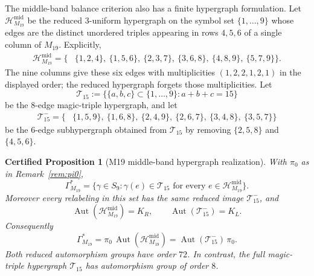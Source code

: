 \documentclass[11pt,a4paper]{article}
\newtheorem{certprop}[theorem]{Certified Proposition}
\theoremstyle{definition}
\theoremstyle{remark}
\providecommand{\Aut}{\operatorname{Aut}}
\newcommand{\GMninetn}{\Gamma^{*}_{M_{19}}}     %
\newcommand{\KL}{K_L}
\newcommand{\KR}{K_R}
\begin{document}
The middle-band balance criterion also has a finite hypergraph
formulation. Let $\mathcal H_{M_{19}}^{\mathrm{mid}}$ be the reduced
$3$-uniform hypergraph on the symbol set $\{1,\dots,9\}$ whose edges
are the distinct unordered triples appearing in rows $4,5,6$ of a
single column of $M_{19}$. Explicitly,
\begin{equation*}
\begin{split}
\mathcal H_{M_{19}}^{\mathrm{mid}}
   = \{&\{1,2,4\},\ \{1,5,6\},\ \{2,3,7\},\
       \{3,6,8\},\ \{4,8,9\},\ \{5,7,9\}\}.
\end{split}
\end{equation*}
The nine columns give these six edges with multiplicities
$(1,2,2,1,2,1)$ in the displayed order; the reduced hypergraph forgets
those multiplicities. Let
\begin{equation*}
   \mathcal T_{15}
      := \bigl\{\{a,b,c\} \subset \{1,\dots,9\} : a+b+c=15\bigr\}
\end{equation*}
be the $8$-edge magic-triple hypergraph, and let
\begin{equation*}
\begin{split}
\mathcal T^-_{15}
   = \{&\{1,5,9\},\ \{1,6,8\},\ \{2,4,9\},\
       \{2,6,7\},\ \{3,4,8\},\ \{3,5,7\}\}
\end{split}
\end{equation*}
be the $6$-edge subhypergraph obtained from $\mathcal T_{15}$ by
removing $\{2,5,8\}$ and $\{4,5,6\}$.

\begin{certprop}[M19 middle-band hypergraph realization]
\label{thm:M19-hypergraph}
With $\pi_0$ as in Remark~\ref{rem:pi0},
\begin{equation}\label{eq:M19-hypergraph-embeddings}
   \GMninetn
   = \bigl\{\gamma\in S_9 :
        \gamma(e) \in \mathcal T_{15}
         \text{ for every } e\in \mathcal H_{M_{19}}^{\mathrm{mid}}
     \bigr\}.
\end{equation}
Moreover every relabeling in this set has the same reduced image
$\mathcal T^-_{15}$, and
\begin{equation}\label{eq:M19-hypergraph-aut}
   \Aut(\mathcal H_{M_{19}}^{\mathrm{mid}}) = \KR,
   \qquad
   \Aut(\mathcal T^-_{15}) = \KL.
\end{equation}
Consequently
\begin{equation}\label{eq:M19-hypergraph-coset}
   \GMninetn
      = \pi_0\,\Aut(\mathcal H_{M_{19}}^{\mathrm{mid}})
      = \Aut(\mathcal T^-_{15})\,\pi_0.
\end{equation}
Both reduced automorphism groups have order $72$. In contrast, the
full magic-triple hypergraph $\mathcal T_{15}$ has automorphism group
of order $8$.
\end{certprop}
\end{document}
